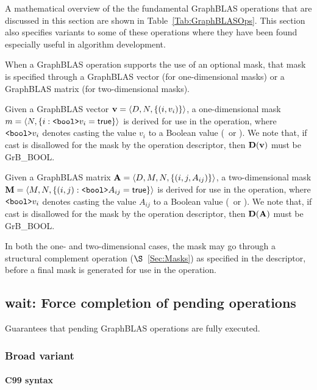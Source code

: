A mathematical overview of the the fundamental GraphBLAS operations that are
discussed in this section are shown in Table~\ref{Tab:GraphBLASOps}.  This
section also specifies variants to some of these operations where they have
been found especially useful in algorithm development.

When a GraphBLAS operation supports the use of an optional mask, that mask is
specified through a GraphBLAS vector (for one-dimensional masks) or
a GraphBLAS matrix (for two-dimensional masks).

Given a GraphBLAS vector ${\bf v} = \langle D,N, \{ (i,v_i) \} \rangle$, a
one-dimensional mask $m = \langle N, \{ i : \mbox{\tt <bool>}v_i = {\sf true} \} \rangle$
is derived for use in the operation, where $\mbox{\tt <bool>}v_i$ denotes
casting the value $v_i$ to a Boolean value (\true\ or \false).
We note that, if cast is disallowed for the mask by the operation descriptor, then
$\bold{D}({\bf v})$ must be {\sf GrB\_BOOL}.

Given a GraphBLAS matrix ${\bf A} = \langle D, M, N, \{ (i,j,A_{ij}) \} \rangle$,
a two-dimensional mask ${\bf M} = \langle M,N, \{ (i,j) : \mbox{\tt <bool>}A_{ij} = {\sf true} \} \rangle$
is derived for use in the operation, where $\mbox{\tt <bool>}v_i$ denotes
casting the value $A_{ij}$ to a Boolean value (\true\ or \false).
We note that, if cast is disallowed for the mask by the operation descriptor, then
$\bold{D}({\bf A})$ must be {\sf GrB\_BOOL}.

In both the one- and two-dimensional cases, the mask may go through a structural
complement operation ($\S$~\ref{Sec:Masks}) as specified in the descriptor, before a final
mask is generated for use in the operation.

\subsection{{\sf wait}: Force completion of pending operations}
\label{Sec:wait}

Guarantees that pending GraphBLAS operations are fully executed.

\subsubsection{Broad variant}

\paragraph{C99 syntax}

